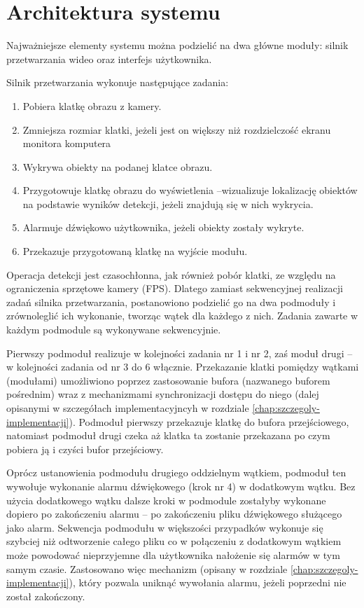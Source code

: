 \section{Architektura systemu}
\label{chap:architektura}
Najważniejsze elementy systemu można podzielić na dwa główne moduły: silnik przetwarzania wideo oraz interfejs użytkownika. 

Silnik przetwarzania wykonuje następujące zadania:
\begin{enumerate}
    \item Pobiera klatkę obrazu z kamery.
    \item Zmniejsza rozmiar klatki, jeżeli jest on większy niż rozdzielczość ekranu monitora komputera
    \item Wykrywa obiekty na podanej klatce obrazu.
    \item Przygotowuje klatkę obrazu do wyświetlenia --wizualizuje lokalizację obiektów na podstawie wyników detekcji, jeżeli znajdują się w nich wykrycia.
    \item Alarmuje dźwiękowo użytkownika, jeżeli obiekty zostały wykryte.
    \item Przekazuje przygotowaną klatkę na wyjście modułu. 
\end{enumerate}

Operacja detekcji jest czasochłonna, jak również pobór klatki, ze względu na ograniczenia sprzętowe kamery (FPS). Dlatego zamiast sekwencyjnej realizacji zadań silnika przetwarzania, postanowiono podzielić go na dwa podmoduły i zrównoleglić ich wykonanie, tworząc wątek dla każdego z nich. Zadania zawarte w każdym podmodule są wykonywane sekwencyjnie.

Pierwszy podmoduł realizuje w kolejności zadania nr 1 i nr 2, zaś moduł drugi -- w kolejności zadania od nr 3 do 6 włącznie. Przekazanie klatki pomiędzy wątkami (modułami) umożliwiono poprzez zastosowanie bufora (nazwanego buforem pośrednim) wraz z mechanizmami synchronizacji dostępu do niego (dalej opisanymi w szczegółach implementacyjncyh w rozdziale \ref{chap:szczegoly-implementacji}). Podmoduł pierwszy przekazuje klatkę do bufora przejściowego, natomiast podmoduł drugi czeka aż klatka ta zostanie przekazana po czym pobiera ją i czyści bufor przejściowy. 

Oprócz ustanowienia podmodułu drugiego oddzielnym wątkiem, podmoduł ten wywołuje wykonanie alarmu dźwiękowego (krok nr 4) w dodatkowym wątku. Bez użycia dodatkowego wątku dalsze kroki w podmodule zostałyby wykonane dopiero po zakończeniu alarmu -- po zakończeniu pliku dźwiękowego służącego jako alarm. Sekwencja podmodułu w większości przypadków wykonuje się szybciej niż odtworzenie całego pliku co w połączeniu z dodatkowym wątkiem może powodować nieprzyjemne dla użytkownika nałożenie się alarmów w tym samym czasie. Zastosowano więc mechanizm (opisany w rozdziale \ref{chap:szczegoly-implementacji}), który pozwala uniknąć wywołania alarmu, jeżeli poprzedni nie został zakończony.

